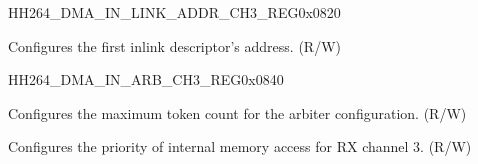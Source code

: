 \begin{register}{H}{H264\_DMA\_IN\_LINK\_ADDR\_CH3\_REG}{0x0820}\label{regdesc:H264DMAINLINKADDRCH3REG}
%
\regnewline%
\begin{regdesc}\begin{reglist}
\label{fielddesc:H264DMAINLINKADDRCH3}\item [H264\_DMA\_INLINK\_ADDR\_CH3] Configures the first inlink descriptor's address. (R/W)
\end{reglist}\end{regdesc}
\end{register}


\begin{register}{H}{H264\_DMA\_IN\_ARB\_CH3\_REG}{0x0840}\label{regdesc:H264DMAINARBCH3REG}
%
%
%
%
\regnewline%
\begin{regdesc}\begin{reglist}
\label{fielddesc:H264DMAINARBTOKENNUMCH3}\item [H264\_DMA\_IN\_ARB\_TOKEN\_NUM\_CH3] Configures the maximum token count for the arbiter configuration. (R/W)
\label{fielddesc:H264DMAINTERINARBPRIORITYCH3}\item [H264\_DMA\_INTER\_IN\_ARB\_PRIORITY\_CH3] Configures the priority of internal memory access for RX channel 3. (R/W)
\end{reglist}\end{regdesc}
\end{register}



